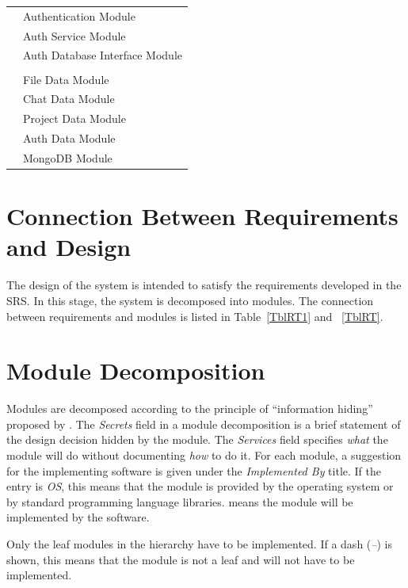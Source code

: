 \documentclass[12pt, titlepage]{article}
\begin{document}
\begin{table}[H]
\begin{longtable}{p{} p{}}
			& Authentication Module \\
			& Auth Service Module \\
			& Auth Database Interface Module \\
			\midrule
			\newpage
			\multirow{1}{0.3\textwidth}{Software Decision Module} & \\
			& File Data Module \\
			& Chat Data Module \\
			& Project Data Module \\
			& Auth Data Module \\
			& MongoDB Module \\
			\bottomrule
			
		\end{longtable}
		
		\label{TblMH}
	\end{table}
	\normalsize
	
	\section{Connection Between Requirements and Design} \label{SecConnection}
	
	The design of the system is intended to satisfy the requirements developed in
	the SRS. In this stage, the system is decomposed into modules. The connection
	between requirements and modules is listed in Table~\ref{TblRT1} and ~\ref{TblRT}.
	
	\section{Module Decomposition} \label{SecMD}
	
	Modules are decomposed according to the principle of ``information hiding''
	proposed by \citet{ParnasEtAl1984}. The \emph{Secrets} field in a module
	decomposition is a brief statement of the design decision hidden by the
	module. The \emph{Services} field specifies \emph{what} the module will do
	without documenting \emph{how} to do it. For each module, a suggestion for the
	implementing software is given under the \emph{Implemented By} title. If the
	entry is \emph{OS}, this means that the module is provided by the operating
	system or by standard programming language libraries.  \emph{\progname{}} means the
	module will be implemented by the \progname{} software.
	
	Only the leaf modules in the hierarchy have to be implemented. If a dash
	(\emph{--}) is shown, this means that the module is not a leaf and will not have
	to be implemented.
	
\end{document}
